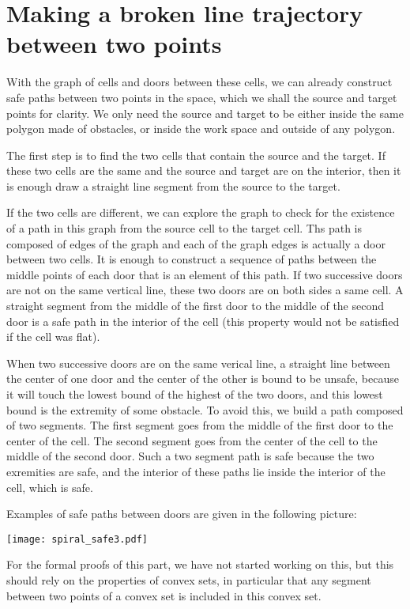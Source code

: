 \documentclass{easychair}
\begin{document}
\section{Making a broken line trajectory between two points}
With the graph of cells and doors between these cells, we can already
construct safe paths between two points in the space, which we shall
the source and target points for clarity.  We only need the source and
target to be either inside the same polygon made of obstacles, or
inside the work space and outside of any polygon.

The first step is to find the two cells that contain the source and
the target.  If these two cells are the same and the source and target
are on the interior, then it is enough draw a straight line segment from the
source to the target.

If the two cells are different, we can explore the graph to check for
the existence of a path in this graph from the source cell to the
target cell.  Ths path is composed of edges of the graph and each of
the graph edges is actually a door between two cells.  It is enough to
construct a sequence of paths between the middle points of each door
that is an element of this path.  If two successive doors are not on the same
vertical line, these two doors are on both sides a same cell.  A
straight segment from the middle of the first door to the middle of
the second door is a safe path in the interior of the cell (this
property would not be satisfied if the cell was flat).

When two successive doors are on the same verical line, a straight
line between the center of one door and the center of the other is
bound to be unsafe, because it will touch the lowest bound of the
highest of the two doors, and this lowest bound is the extremity of
some obstacle.  To avoid this, we build a path composed of two
segments.  The first segment goes from the middle of the first door to
the center of the cell.  The second segment goes from the center of
the cell to the middle of the second door.  Such a two segment path is
safe because the two exremities are safe, and the interior of these
paths lie inside the interior of the cell, which is safe.

Examples of safe paths between doors are given in the following
picture:
\begin{center}
\texttt{[image: spiral\_safe3.pdf]}
\end{center}


For the formal proofs of this part, we have not started working on
this, but this should rely on the properties of convex sets, in
particular that any segment between two points of a convex set is
included in this convex set.
\end{document}
